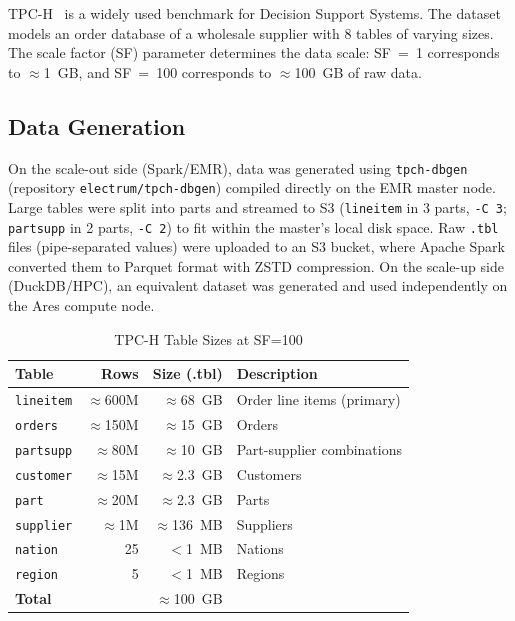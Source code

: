 \documentclass[12pt,a4paper]{article}
\begin{document}
TPC-H~\cite{tpch} is a widely used benchmark for Decision Support Systems. The dataset
models an order database of a wholesale supplier with 8 tables of varying sizes. The
scale factor (SF) parameter determines the data scale: SF~=~1 corresponds to
$\approx$1~GB, and SF~=~100 corresponds to $\approx$100~GB of raw data.

\subsection{Data Generation}

On the scale-out side (Spark/EMR), data was generated using \texttt{tpch-dbgen}
(repository \texttt{electrum/tpch-dbgen}) compiled directly on the EMR master node.
Large tables were split into parts and streamed to S3 (\texttt{lineitem} in 3 parts,
\texttt{-C~3}; \texttt{partsupp} in 2 parts, \texttt{-C~2}) to fit within the
master's local disk space. Raw \texttt{.tbl} files (pipe-separated values) were
uploaded to an S3 bucket, where Apache Spark converted them to Parquet format with
ZSTD compression. On the scale-up side (DuckDB/HPC), an equivalent dataset was
generated and used independently on the Ares compute node.

\begin{table}[H]
  \centering
  \caption{TPC-H Table Sizes at SF=100}
  \label{tab:tpch-sizes}
  \begin{tabular}{lrrl}
    \toprule
    \textbf{Table} & \textbf{Rows} & \textbf{Size (.tbl)} & \textbf{Description} \\
    \midrule
    \texttt{lineitem}  & $\approx$600M & $\approx$68~GB  & Order line items (primary) \\
    \texttt{orders}    & $\approx$150M & $\approx$15~GB  & Orders \\
    \texttt{partsupp}  & $\approx$80M  & $\approx$10~GB  & Part-supplier combinations \\
    \texttt{customer}  & $\approx$15M  & $\approx$2.3~GB & Customers \\
    \texttt{part}      & $\approx$20M  & $\approx$2.3~GB & Parts \\
    \texttt{supplier}  & $\approx$1M   & $\approx$136~MB & Suppliers \\
    \texttt{nation}    & 25            & $<$1~MB         & Nations \\
    \texttt{region}    & 5             & $<$1~MB         & Regions \\
    \midrule
    \textbf{Total}     &               & $\approx$100~GB & \\
    \bottomrule
  \end{tabular}
\end{table}
\end{document}
